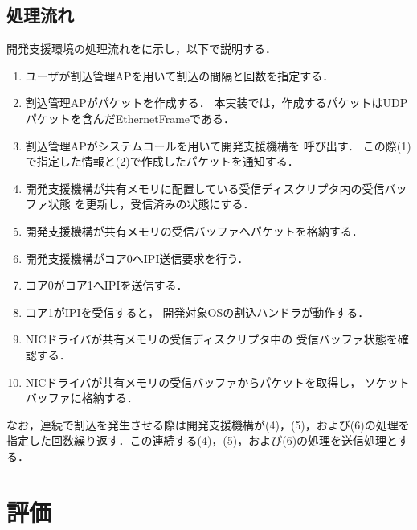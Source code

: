 \documentclass[submit,techreq,noauthor,dvipdfmx]{ipsj}
\begin{document}
\subsection{処理流れ}\label{chap:implemantation}
開発支援環境の処理流れをに示し，以下で説明する．
\begin{enumerate}
    \item
        ユーザが割込管理APを用いて割込の間隔と回数を指定する．
    \item 
        割込管理APがパケットを作成する．
        本実装では，作成するパケットはUDPパケットを含んだEthernetFrameである．
    \item 
        割込管理APがシステムコールを用いて開発支援機構を
        呼び出す．
        この際(1)で指定した情報と(2)で作成したパケットを通知する．
    \item 
        開発支援機構が共有メモリに配置している受信ディスクリプタ内の受信バッファ状態
        を更新し，受信済みの状態にする．
    \item 
        開発支援機構が共有メモリの受信バッファへパケットを格納する．
    \item
        開発支援機構がコア0へIPI送信要求を行う．
    \item
        コア0がコア1へIPIを送信する．
    \item 
        コア1がIPIを受信すると，
        開発対象OSの割込ハンドラが動作する．
    \item 
        NICドライバが共有メモリの受信ディスクリプタ中の
        受信バッファ状態を確認する．
    \item 
        NICドライバが共有メモリの受信バッファからパケットを取得し，
        ソケットバッファに格納する．
\end{enumerate}
なお，連続で割込を発生させる際は開発支援機構が(4)，(5)，および(6)の処理を
指定した回数繰り返す．この連続する(4)，(5)，および(6)の処理を送信処理とする．

\section{評価}\label{chap:evaluation}
\end{document}
